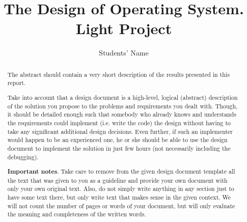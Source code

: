 \documentclass[a4paper,12pt]{report}
\title{The Design of \OSName{} Operating System. Light Project}
\author{Students' Name}
\begin{document}


\maketitle

\begin{abstract}
The abstract should contain a very short description of the results presented in this report. 

Take into account that a design document is a high-level, logical (abstract) description of the solution you propose to the problems and requirements you dealt with. Though, it should be detailed enough such that somebody who already knows and understands the requirements could implement (i.e. write the code) the design without having to take any significant additional design decisions. Even further, if such an implementer would happen to be an experienced one, he or she should be able to use the design document to implement the solution in just few hours (not necessarily including the debugging). 

\textbf{Important notes}. Take care to remove from the given design document template all the text that was given to you as a guideline and provide your own document with only your own original text. Also, do not simply write anything in any section just to have some text there, but only write text that makes sense in the given context. We will not count the number of pages or words of your document, but will only evaluate the meaning and completeness of the written words. 
\end{abstract}














\end{document}
